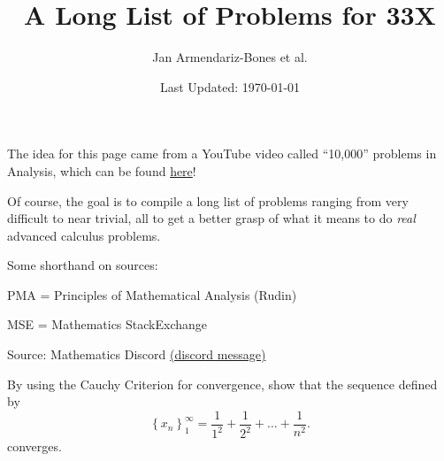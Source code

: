 \documentclass[letterpaper,twoside]{article}
\title{A Long List of Problems for 33X}
\author{Jan Armendariz-Bones et al.}
\date{Last Updated: \today}
\begin{document}
{\let\newpage\relax\maketitle}
\maketitle
The idea for this page came from a YouTube video called ``10,000'' problems in Analysis, which can be found \href{https://youtu.be/3mvNug_YM-g?si=9sa2EVkcANsY7IBk}{here}!

Of course, the goal is to compile a long list of problems ranging from very difficult to near trivial, all to get a better grasp of what it means to do \emph{real} advanced calculus problems.

Some shorthand on sources:

\noindent PMA = Principles of Mathematical Analysis (Rudin)

\noindent MSE = Mathematics StackExchange
\newpage
\begin{que}
		Source: Mathematics Discord \href{https://discord.com/channels/268882317391429632/576508782637744130/1169106442435969094}{(discord message)}

		By using the Cauchy Criterion for convergence, show that the sequence defined by \[\left\{x_n\right\}_1^\infty=\frac{1}{1^2}	+ \frac{1}{2^2}	+ \dots + \frac{1}{n^2}.\] converges.
\end{que}	
\end{document}
